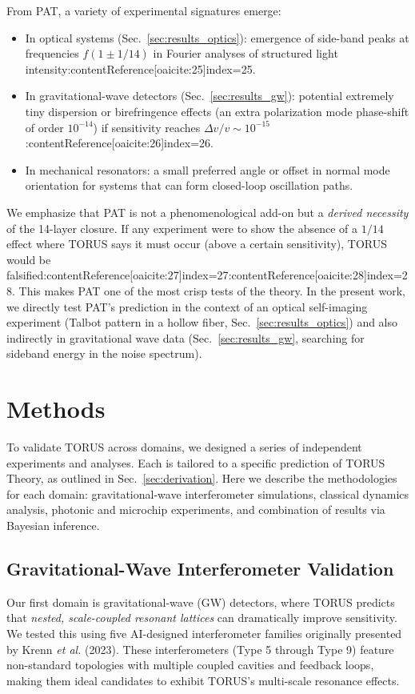 \documentclass[12pt]{article}
\begin{document}
From PAT, a variety of experimental signatures emerge:
\begin{itemize}\itemsep 0pt
    \item In optical systems (Sec.~\ref{sec:results_optics}): emergence of side-band peaks at frequencies $f(1\pm 1/14)$ in Fourier analyses of structured light intensity:contentReference[oaicite:25]{index=25}.
    \item In gravitational-wave detectors (Sec.~\ref{sec:results_gw}): potential extremely tiny dispersion or birefringence effects (an extra polarization mode phase-shift of order $10^{-14}$) if sensitivity reaches $\Delta v/v \sim 10^{-15}$:contentReference[oaicite:26]{index=26}.
    \item In mechanical resonators: a small preferred angle or offset in normal mode orientation for systems that can form closed-loop oscillation paths.
\end{itemize}

We emphasize that PAT is not a phenomenological add-on but a \emph{derived necessity} of the 14-layer closure. If any experiment were to show the absence of a $1/14$ effect where TORUS says it must occur (above a certain sensitivity), TORUS would be falsified:contentReference[oaicite:27]{index=27}:contentReference[oaicite:28]{index=28}. This makes PAT one of the most crisp tests of the theory. In the present work, we directly test PAT’s prediction in the context of an optical self-imaging experiment (Talbot pattern in a hollow fiber, Sec.~\ref{sec:results_optics}) and also indirectly in gravitational wave data (Sec.~\ref{sec:results_gw}, searching for sideband energy in the noise spectrum).

\section{Methods}\label{sec:methods}
To validate TORUS across domains, we designed a series of independent experiments and analyses. Each is tailored to a specific prediction of TORUS Theory, as outlined in Sec.~\ref{sec:derivation}. Here we describe the methodologies for each domain: gravitational-wave interferometer simulations, classical dynamics analysis, photonic and microchip experiments, and combination of results via Bayesian inference.

\subsection{Gravitational-Wave Interferometer Validation}\label{sec:methods_gw}
Our first domain is gravitational-wave (GW) detectors, where TORUS predicts that \emph{nested, scale-coupled resonant lattices} can dramatically improve sensitivity. We tested this using five AI-designed interferometer families originally presented by Krenn \emph{et al.} (2023). These interferometers (Type 5 through Type 9) feature non-standard topologies with multiple coupled cavities and feedback loops, making them ideal candidates to exhibit TORUS’s multi-scale resonance effects.
\end{document}

